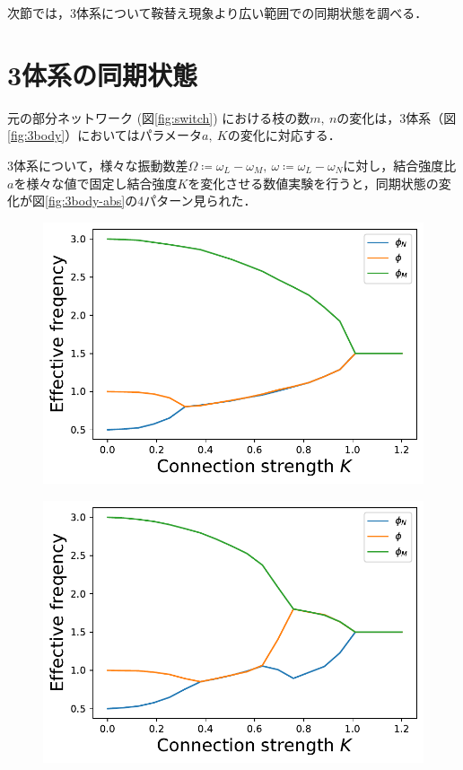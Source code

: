 \documentclass[../main]{subfiles}
\begin{document}
次節では，3体系について鞍替え現象より広い範囲での同期状態を調べる．
\section{3体系の同期状態}
\label{sec:3body-synchro-state}
元の部分ネットワーク (図\ref{fig:switch}) における枝の数$m,\ n$の変化は，3体系（図\ref{fig:3body}）においてはパラメータ$a,\ K$の変化に対応する．

3体系について，様々な振動数差$\Omega\coloneqq\omega_L-\omega_M,\ \omega\coloneqq\omega_L-\omega_N$に対し，結合強度比$a$を様々な値で固定し結合強度$K$を変化させる数値実験を行うと，同期状態の変化が図\ref{fig:3body-abs}の4パターン見られた．

\captionsetup[figure]{justification=centering}
\begin{figure}[tbp]
    \begin{minipage}[b]{0.47\linewidth}
        \centering
        \includegraphics[keepaspectratio, scale=0.42]{images/three-body-prob-notapprox-a150.pdf}
        \label{fig:3body-notapprox150}
    \end{minipage}
    \begin{minipage}[b]{0.47\linewidth}
      \centering
      \includegraphics[keepaspectratio, scale=0.42]{images/three-body-prob-notapprox-a175.pdf}

\end{minipage}
\end{figure}
\end{document}
